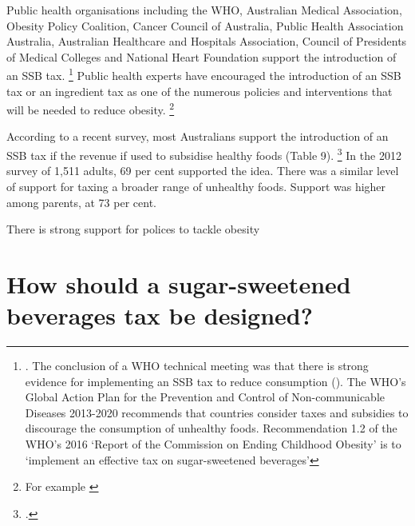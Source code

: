 \documentclass[embargoed]{grattan}
\begin{document}
Public health organisations including the WHO, Australian Medical Association, Obesity Policy Coalition, Cancer Council of Australia, Public Health Association Australia, Australian Healthcare and Hospitals Association, Council of Presidents of Medical Colleges and National Heart Foundation support the introduction of an SSB tax.%
\footnote{\textcites{Coalition2016Policybriefcase}{Health2016Insufficientphysicalactivity}{Health2016Insufficientphysicalactivity}.
The conclusion of a WHO technical meeting was that there is strong evidence for implementing an SSB tax to reduce consumption (\textcite{Organization2016FiscalPoliciesDiet}).
The WHO's Global Action Plan for the Prevention and Control of Non-communicable Diseases 2013-2020 recommends that countries consider taxes and subsidies to discourage the consumption of unhealthy foods.
Recommendation 1.2 of the WHO's 2016 `Report of the Commission on Ending Childhood Obesity' is to `implement an effective tax on sugar-sweetened beverages'} Public health experts have encouraged the introduction of an SSB tax or an ingredient tax as one of the numerous policies and interventions that will be needed to reduce obesity.%
\footnote{For example \textcites{Brownell2009Ouncespreventionthepublic}{Veerman2016ImpactTaxSugar}{Sharma2014effectstaxingsugarsweetened}{NiMhurchu2014Twentypercenttax}{Kaplin2013Usingeconomicpolicy}{Long2015Costeffectivenesssugar}{Cawley2015IncidenceTaxesSugar}}

According to a recent survey, most Australians support the introduction of an SSB tax if the revenue if used to subsidise healthy foods (Table 9).%
\footcite{Morley2012Publicopinionfood} In the 2012 survey of 1,511 adults, 69 per cent supported the idea.
There was a similar level of support for taxing a broader range of unhealthy foods.
Support was higher among parents, at 73 per cent. 

\begin{table}
\caption{There is strong support for polices to tackle obesity}




\end{table}

\chapter{How should a sugar-sweetened beverages tax be designed?}\label{how-should-a-sugar-sweetened-beverages-tax-be-designed}
\end{document}

